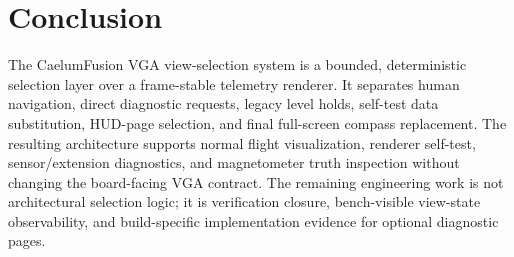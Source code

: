 \documentclass{article}
\begin{document}
\section{Conclusion}

The CaelumFusion VGA view-selection system is a bounded, deterministic
selection layer over a frame-stable telemetry renderer.  It separates human
navigation, direct diagnostic requests, legacy level holds, self-test data
substitution, HUD-page selection, and final full-screen compass replacement.
The resulting architecture supports normal flight visualization, renderer
self-test, sensor/extension diagnostics, and magnetometer truth inspection
without changing the board-facing VGA contract.  The remaining engineering
work is not architectural selection logic; it is verification closure,
bench-visible view-state observability, and build-specific implementation
evidence for optional diagnostic pages.
\end{document}
